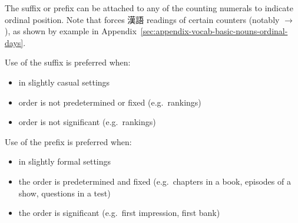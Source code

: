 \documentclass[../nihongo-gakushuu-kyouzai.tex]{subfiles}
\begin{document}
The  suffix or  prefix can be attached to any of the counting numerals to indicate ordinal position. Note that  forces 漢語 readings of certain counters (notably  $\to$ ), as shown by example in Appendix~\ref{sec:appendix-vocab-basic-nouns-ordinal-days}.

Use of the  suffix is preferred when:
\begin{itemize}
    \item in slightly casual settings
    \item order is not predetermined or fixed (e.g.\ rankings)
    \item order is not significant (e.g.\ rankings)
\end{itemize}

Use of the  prefix is preferred when:
\begin{itemize}
    \item in slightly formal settings
    \item the order is predetermined and fixed (e.g.\ chapters in a book, episodes of a show, questions in a test)
    \item the order is significant (e.g.\ first impression, first bank)
\end{itemize}
\end{document}
